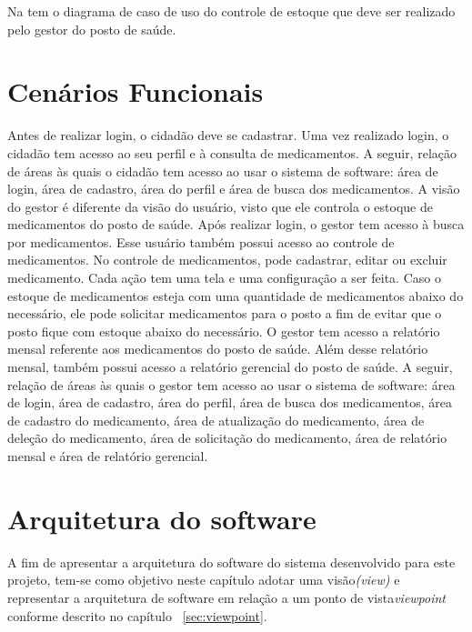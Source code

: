 Na  tem o diagrama de caso de uso do controle de estoque que deve ser realizado pelo gestor do posto de saúde.

%

\section{Cenários Funcionais}

Antes de realizar login, o cidadão deve se cadastrar. Uma vez realizado login, o cidadão tem acesso ao seu perfil e à consulta de medicamentos. A seguir, relação de áreas às quais o cidadão tem acesso ao usar o sistema de software: área de login, área de cadastro, área do perfil e área de busca dos medicamentos. A visão do gestor é diferente da visão do usuário, visto que ele controla o estoque de medicamentos do posto de saúde. Após realizar login, o gestor tem acesso à busca por medicamentos. Esse usuário também possui acesso ao controle de medicamentos. No controle de medicamentos, pode cadastrar, editar ou excluir medicamento. Cada ação tem uma tela e uma configuração a ser feita. Caso o estoque de medicamentos esteja com uma quantidade de medicamentos abaixo do necessário, ele pode solicitar medicamentos para o posto a fim de evitar que o posto fique com estoque abaixo do necessário. O gestor tem acesso a relatório mensal referente aos medicamentos do posto de saúde. Além desse relatório mensal, também possui acesso a relatório gerencial do posto de saúde. A seguir, relação de áreas às quais o gestor tem acesso ao usar o sistema de software: área de login, área de cadastro, área do perfil, área de busca dos medicamentos, área de cadastro do medicamento, área de atualização do medicamento, área de deleção do medicamento, área de solicitação do medicamento, área de relatório mensal e área de relatório gerencial.

\section{Arquitetura do software}
\label{sec:arquitetura}

A fim de apresentar a arquitetura do software do sistema desenvolvido para este projeto, tem-se como objetivo neste capítulo adotar uma visão\emph{(view)} e representar a arquitetura de software em relação a um ponto de vista\emph{viewpoint} conforme descrito no capítulo ~\ref{sec:viewpoint}.


